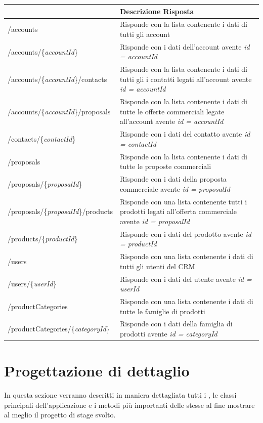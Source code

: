 	\begin{small}
		\begin{longtable}{ | l | p{8cm} | }
			\hline \textbf{\glo{URL}} & \textbf{Descrizione Risposta}\\
			\hline /accounts & Risponde con la lista contenente i dati di tutti gli account\\
			\hline /accounts/\{\textit{accountId}\} & Risponde con i dati dell'account avente \textit{id = accountId}\\    
			\hline /accounts/\{\textit{accountId}\}/contacts & Risponde con la lista contenente i dati di tutti gli i contatti legati all'account avente \textit{id = accountId}\\
			\hline /accounts/\{\textit{accountId}\}/proposals & Risponde con la lista contenente i dati di tutte le offerte commerciali legate all'account avente \textit{id = accountId}\\
			\hline /contacts/\{\textit{contactId}\} & Risponde con i dati del contatto avente \textit{id = contactId}\\
			\hline /proposals & Risponde con la lista contenente i dati di tutte le proposte commerciali\\
			\hline /proposals/\{\textit{proposalId}\} & Risponde con i dati della proposta commerciale avente \textit{id = proposalId}\\    
			\hline /proposals/\{\textit{proposalId}\}/products & Risponde con una lista contenente tutti i prodotti legati all'offerta commerciale avente \textit{id =  proposalId}\\
			\hline /products/\{\textit{productId}\} & Risponde con i dati del prodotto avente \textit{id = productId}\\
			\hline /users & Risponde con una lista contenente i dati di tutti gli utenti del CRM\\
			\hline /users/\{\textit{userId}\} & Risponde con i dati del utente avente \textit{id = userId}\\    
			\hline /productCategories & Risponde con una lista contenente i dati di tutte le famiglie di prodotti\\
			\hline /productCategories/\{\textit{categoryId}\} & Risponde con i dati della famiglia di prodotti avente \textit{id = categoryId}\\		
			\hline 
		\end{longtable}		
	\end{small}
\endgroup
\section{Progettazione di dettaglio}\label{progettazioneDiDettaglio}
In questa sezione verranno descritti in maniera dettagliata tutti i , le classi principali dell'applicazione e i metodi più importanti delle stesse al fine mostrare al meglio il progetto di stage svolto.

